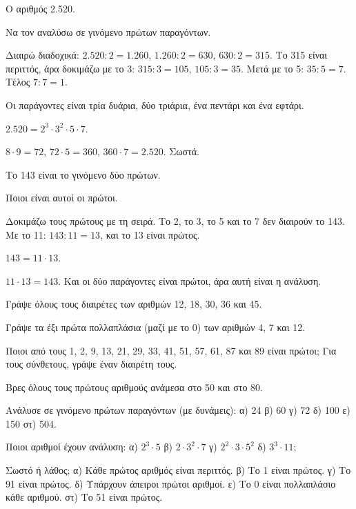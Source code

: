\tixero Ο αριθμός 2.520.\par
\tithelo Να τον αναλύσω σε γινόμενο πρώτων παραγόντων.\par
\possindeo Διαιρώ διαδοχικά: $2.520:2=1.260$, $1.260:2=630$, $630:2=315$. Το 315 είναι περιττός, άρα δοκιμάζω με το 3: $315:3=105$, $105:3=35$. Μετά με το 5: $35:5=7$. Τέλος $7:7=1$.\par
Οι παράγοντες είναι τρία δυάρια, δύο τριάρια, ένα πεντάρι και ένα εφτάρι.\par
\apantisi $2.520=2^3\cdot 3^2\cdot 5\cdot 7$.\par
\elegxos $8\cdot 9=72$, $72\cdot 5=360$, $360\cdot 7=2.520$. Σωστά.

\tixero Το 143 είναι το γινόμενο δύο πρώτων.\par
\tithelo Ποιοι είναι αυτοί οι πρώτοι.\par
\possindeo Δοκιμάζω τους πρώτους με τη σειρά. Το 2, το 3, το 5 και το 7 δεν διαιρούν το 143. Με το 11: $143:11=13$, και το 13 είναι πρώτος.\par
\apantisi $143=11\cdot 13$.\par
\elegxos $11\cdot 13=143$. Και οι δύο παράγοντες είναι πρώτοι, άρα αυτή είναι η ανάλυση.



\ex Γράψε όλους τους διαιρέτες των αριθμών 12, 18, 30, 36 και 45.

\ex Γράψε τα έξι πρώτα πολλαπλάσια (μαζί με το 0) των αριθμών 4, 7 και 12.

\ex Ποιοι από τους 1, 2, 9, 13, 21, 29, 33, 41, 51, 57, 61, 87 και 89 είναι πρώτοι; Για τους σύνθετους, γράψε έναν διαιρέτη τους.

\ex Βρες όλους τους πρώτους αριθμούς ανάμεσα στο 50 και στο 80.

\ex Ανάλυσε σε γινόμενο πρώτων παραγόντων (με δυνάμεις): α) 24 \quad β) 60 \quad γ) 72 \quad δ) 100 \quad ε) 150 \quad στ) 504.

\ex Ποιοι αριθμοί έχουν ανάλυση: α) $2^3\cdot 5$ \quad β) $2\cdot 3^2\cdot 7$ \quad γ) $2^2\cdot 3\cdot 5^2$ \quad δ) $3^3\cdot 11$;

\ex Σωστό ή λάθος; α) Κάθε πρώτος αριθμός είναι περιττός. \quad β) Το 1 είναι πρώτος. \quad γ) Το 91 είναι πρώτος. \quad δ) Υπάρχουν άπειροι πρώτοι αριθμοί. \quad ε) Το 0 είναι πολλαπλάσιο κάθε αριθμού. \quad στ) Το 51 είναι πρώτος.


